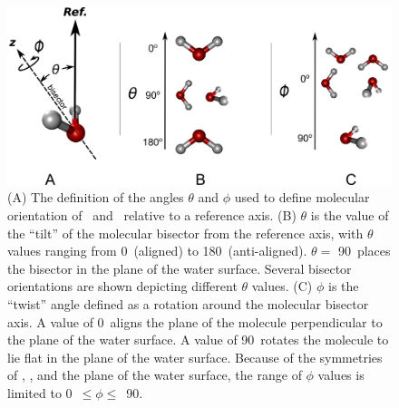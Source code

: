 \begin{figure}[h!]
	\begin{center}
		\includegraphics[scale=1.0]{images/angle-cartoons/molecular-angles-small.png}
		\caption{(A) The definition of the angles $\theta$ and $\phi$ used to define molecular orientation of \suldiox~and \wat~relative to a reference axis. (B) $\theta$ is the value of the ``tilt'' of the molecular bisector from the reference axis, with $\theta$ values ranging from  0\textdegree~(aligned) to 180\textdegree~(anti-aligned). $\theta = $ 90\textdegree~places the bisector in the plane of the water surface. Several bisector orientations are shown depicting different $\theta$ values. (C) $\phi$ is the ``twist'' angle defined as a rotation around the molecular bisector axis. A value of 0\textdegree~aligns the plane of the molecule perpendicular to the plane of the water surface. A value of 90\textdegree~rotates the molecule to lie flat in the plane of the water surface. Because of the symmetries of \suldiox, \wat, and the plane of the water surface, the range of $\phi$ values is limited to 0\textdegree~$\leq \phi \leq$~90\textdegree.}
		\label{fig:water-angles}
	\end{center}
\end{figure}

